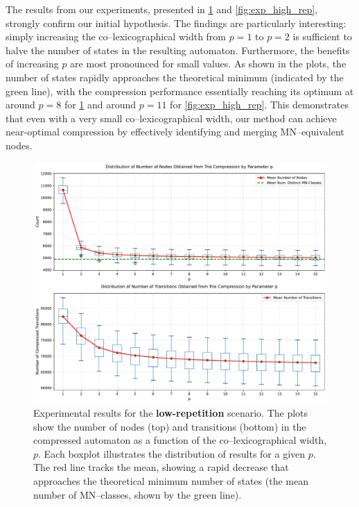 The results from our experiments, presented in \cref{fig:exp_low_rep} and \cref{fig:exp_high_rep}, strongly confirm our initial hypothesis. The findings are particularly interesting: simply increasing the co--lexicographical width from $p=1$ to $p=2$ is sufficient to halve the number of states in the resulting automaton. Furthermore, the benefits of increasing $p$ are most pronounced for small values. As shown in the plots, the number of states rapidly approaches the theoretical minimum (indicated by the green line), with the compression performance essentially reaching its optimum at around $p=8$ for \cref{fig:exp_low_rep} and around $p=11$ for \cref{fig:exp_high_rep}. This demonstrates that even with a very small co--lexicographical width, our method can achieve near-optimal compression by effectively identifying and merging MN--equivalent nodes.

\begin{figure}[H]
    \centering
    \includegraphics[width=1\linewidth]{Immagini/tree_compression_analysis_low.pdf}
    \caption{Experimental results for the \textbf{low-repetition} scenario. The plots show the number of nodes (top) and transitions (bottom) in the compressed automaton as a function of the co--lexicographical width, $p$. Each boxplot illustrates the distribution of results for a given $p$. The red line tracks the mean, showing a rapid decrease that approaches the theoretical minimum number of states (the mean number of MN--classes, shown by the green line).}
    \label{fig:exp_low_rep}
\end{figure}

